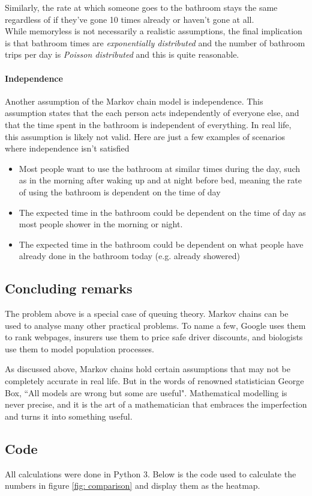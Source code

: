 Similarly, the rate at which someone goes to the bathroom stays the same regardless of if they've gone 10 times already or haven't gone at all.
\\

While memoryless is not necessarily a realistic assumptions, the final implication is that bathroom times are \textit{exponentially distributed} and the number of bathroom trips per day is \textit{Poisson distributed} and this is quite reasonable.

\paragraph{Independence}
Another assumption of the Markov chain model is independence. This assumption states that the each person acts independently of everyone else, and that the time spent in the bathroom is independent of everything. In real life, this assumption is likely not valid. Here are just a few examples of scenarios where independence isn't satisfied
\begin{itemize}
	\item Most people want to use the bathroom at similar times during the day, such as in the morning after waking up and at night before bed, meaning the rate of using the bathroom is dependent on the time of day
	\item The expected time in the bathroom could be dependent on the time of day as most people shower in the morning or night.
	\item The expected time in the bathroom could be dependent on what people have already done in the bathroom today (e.g. already showered)

\end{itemize}

\subsection*{Concluding remarks}
The problem above is a special case of queuing theory. Markov chains can be used to analyse many other practical problems. To name a few, Google uses them to rank webpages, insurers use them to price safe driver discounts, and biologists use them to model population processes.

As discussed above, Markov chains hold certain assumptions that may not be completely accurate in real life. But in the words of renowned statistician George Box, ``All models are wrong but some are useful". Mathematical modelling is never precise, and it is the art of a mathematician that embraces the imperfection and turns it into something useful.

\newpage
\subsection*{Code}
All calculations were done in Python 3. Below is the code used to calculate the numbers in figure \ref{fig: comparison} and display them as the heatmap.
